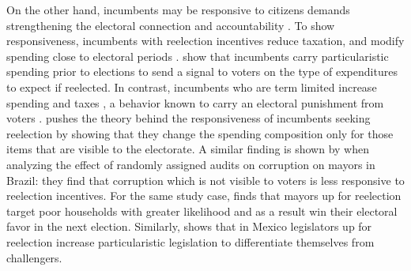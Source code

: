 On the other hand, incumbents may be responsive to citizens demands strengthening the electoral connection and accountability \citep{mayhew_1974, manin_etal_1999, cox_katz_2002}. To show responsiveness, incumbents with reelection incentives reduce taxation, and modify spending close to electoral periods \citep{Rogoff_1988, Rogoff_1990, klein_sakurai_2015}. \citet{Drazen_eslava_2005} show that incumbents carry particularistic spending prior to elections to send a signal to voters on the type of expenditures to expect if reelected. In contrast, incumbents who are term limited increase spending and taxes \citep{Besley_case_1995}, a behavior known to carry an electoral punishment from voters \citep{peltzman_1992}. \citet{akhmedov_2004} pushes the theory behind the responsiveness of incumbents seeking reelection by showing that they change the spending composition only for those items that are visible to the electorate. A similar finding is shown by \citet{ferraz_finan_2011} when analyzing the effect of randomly assigned audits on corruption on mayors in Brazil: they find that corruption which is not visible to voters is less responsive to reelection incentives. For the same study case, \citet{frey_2021} finds that mayors up for reelection target poor households with greater likelihood and as a result win their electoral favor in the next election. Similarly, \citet{motolinia_2020} shows that in Mexico legislators up for reelection increase particularistic legislation to differentiate themselves from challengers. 

